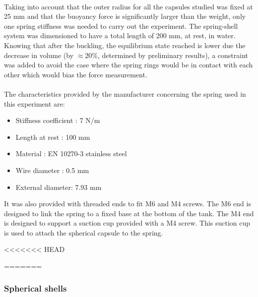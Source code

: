 \paragraph{}
Taking into account that the outer radius for all the capsules studied was fixed at 25 mm and that the buoyancy force is significantly larger than the weight, only one spring stiffness was needed to carry out the experiment.
The spring-shell system was dimensioned to have a total length of 200 mm, at rest, in water. Knowing that after the buckling, the equilibrium state reached is lower due the decrease in volume (by $\approx 20\%$, determined by preliminary results), a constraint was added to avoid the case where the spring rings would be in contact with each other which would bias the force measurement.
\paragraph{}
The characteristics provided by the manufacturer concerning the spring used in this experiment are:
\
\begin{itemize}
	\item Stiffness coefficient : 7 N/m
	\item Length at rest : 100 mm 
	\item Material : EN 10270-3 stainless steel
	\item Wire diameter : 0.5 mm
	\item External diameter: 7.93 mm
\end{itemize}

It was also provided with threaded ends to fit M6 and M4 screws. The M6 end is designed to link the spring to a fixed base at the bottom of the tank. The M4 end is designed to support a suction cup provided with a M4 screw. This suction cup is used to attach the spherical capsule to the spring.


<<<<<<< HEAD

=======
\subsubsection{Spherical shells}
\label{sec:Spherical_shells}
